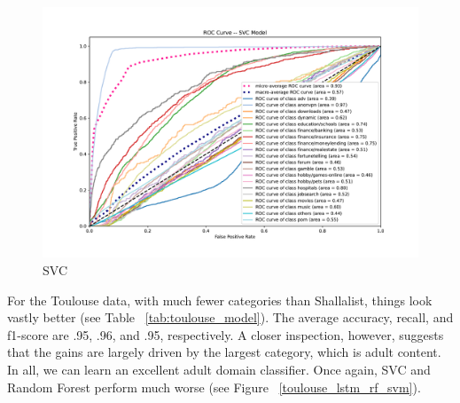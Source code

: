 \documentclass[12pt, letterpaper]{article}
\begin{document}
\begin{figure}[!htb]
\begin{minipage}[b]{0.3\textwidth}
	\includegraphics[width=\textwidth]{figs/roc-shalla-2017-svc.pdf}\\SVC
	\end{minipage}
\end{figure}

For the Toulouse data, with much fewer categories than Shallalist, things look vastly better (see Table ~\ref{tab:toulouse_model}). The average accuracy, recall, and f1-score are .95, .96, and .95, respectively. A closer inspection, however, suggests that the gains are largely driven by the largest category, which is adult content. In all, we can learn an excellent adult domain classifier. Once again, SVC and Random Forest perform much worse (see Figure ~\ref{toulouse_lstm_rf_svm}).
\end{document}
